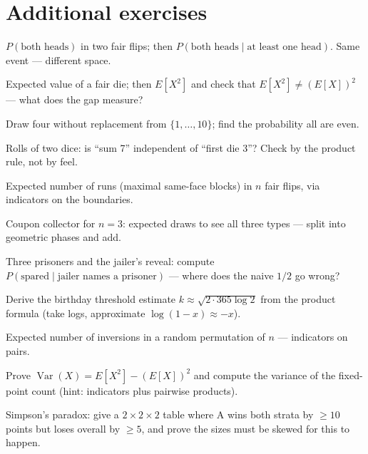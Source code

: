 \section{Additional exercises}
\begin{exercise}[easy]
$P(\text{both heads})$ in two fair flips; then
$P(\text{both heads} \mid \text{at least one head})$. Same event ---
different space.
\end{exercise}
\begin{exercise}[easy]
Expected value of a fair die; then $E[X^2]$ and check that
$E[X^2] \ne (E[X])^2$ --- what does the gap measure?
\end{exercise}
\begin{exercise}[easy]
Draw four without replacement from $\{1,\dots,10\}$; find
the probability all are even.
\end{exercise}
\begin{exercise}[easy]
Rolls of two dice: is ``sum 7'' independent of ``first die 3''? Check
by the product rule, not by feel.
\end{exercise}
\begin{exercise}[medium]
Expected number of runs (maximal same-face blocks) in $n$ fair flips,
via indicators on the boundaries.
\end{exercise}
\begin{exercise}[medium]
Coupon collector for $n = 3$: expected draws to see all three types
--- split into geometric phases and add.
\end{exercise}
\begin{exercise}[medium]
Three prisoners and the jailer's reveal: compute
$P(\text{spared} \mid \text{jailer names a prisoner})$ --- where does
the naive $1/2$ go wrong?
\end{exercise}
\begin{exercise}[medium]
Derive the birthday threshold estimate $k \approx \sqrt{2 \cdot 365
\log 2}$ from the product formula (take logs, approximate
$\log(1-x) \approx -x$).
\end{exercise}
\begin{exercise}[medium]
Expected number of inversions in a random permutation of $n$ ---
indicators on pairs.
\end{exercise}
\begin{exercise}[hard]
Prove $\operatorname{Var}(X) = E[X^2] - (E[X])^2$ and compute the
variance of the fixed-point count (hint: indicators plus pairwise
products).
\end{exercise}
\begin{exercise}[hard]
Simpson's paradox: give a $2\times2\times2$ table where A wins both
strata by $\ge 10$ points but loses overall by $\ge 5$, and prove the
sizes must be skewed for this to happen.
\end{exercise}

